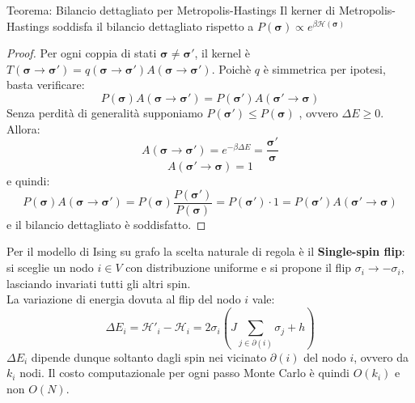 \begin{boxl}{Teorema: Bilancio dettagliato per Metropolis-Hastings}
Il kerner di Metropolis-Hastings soddisfa il bilancio dettagliato rispetto a $P(\mathbf{\sigma}) \propto e^{\beta \mathcal{H}(\mathbf{\sigma})}$
\end{boxl}
\begin{proof}
    Per ogni coppia di stati $\mathbf{\sigma} \not = \mathbf{\sigma}'$, il kernel è $T(\mathbf{\sigma} \to \mathbf{\sigma}')=q(\mathbf{\sigma} \to \mathbf{\sigma}') A(\mathbf{\sigma} \to \mathbf{\sigma}')$. Poichè $q$ è simmetrica per ipotesi, basta verificare:
    \begin{equation}
        P(\mathbf{\sigma})A(\mathbf{\sigma} \to \mathbf{\sigma}')=P(\mathbf{\sigma}')A(\mathbf{\sigma}' \to \mathbf{\sigma})
    \end{equation}
    Senza perdità di generalità supponiamo $P(\mathbf{\sigma}')\le P(\mathbf{\sigma})$ , ovvero $\Delta E \ge 0$. Allora:
    \begin{equation}
        A(\mathbf{\sigma}\to \mathbf{\sigma}')=e^{-\beta \Delta E}=\frac{\mathbf{\sigma}'}{\mathbf{\sigma}}
    \end{equation}
    \begin{equation}
        A(\mathbf{\sigma}'\to \mathbf{\sigma})=1 
    \end{equation}
    e quindi:
    \begin{equation}
        P(\mathbf{\sigma})A(\mathbf{\sigma} \to \mathbf{\sigma}')=P(\mathbf{\sigma})\frac{P(\mathbf{\sigma}')}{P(\mathbf{\sigma})}=P(\mathbf{\sigma}') \cdot 1=P(\mathbf{\sigma}')A(\mathbf{\sigma}' \to \mathbf{\sigma})
    \end{equation}
e il bilancio dettagliato è soddisfatto.
\end{proof}
Per il modello di Ising su grafo la scelta naturale di regola è il \textbf{Single-spin flip}: si sceglie un nodo $i \in V$ con distribuzione uniforme e si propone il flip $\sigma_i \to -\sigma_i$, lasciando invariati tutti gli altri spin.\\
La variazione di energia dovuta al flip del nodo $i$ vale:
\begin{equation}
    \Delta E_i=\mathcal{H}'_i-\mathcal{H}_i=2\sigma_i \left(J\sum_{j \in \partial(i)}^{}\sigma_j+h\right) 
\end{equation}
$\Delta E_i$ dipende dunque soltanto dagli spin nei vicinato $\partial(i)$ del nodo $i$, ovvero da $k_i$ nodi. Il costo computazionale per ogni passo Monte Carlo è quindi $O(k_i)$ e non $O(N)$.

